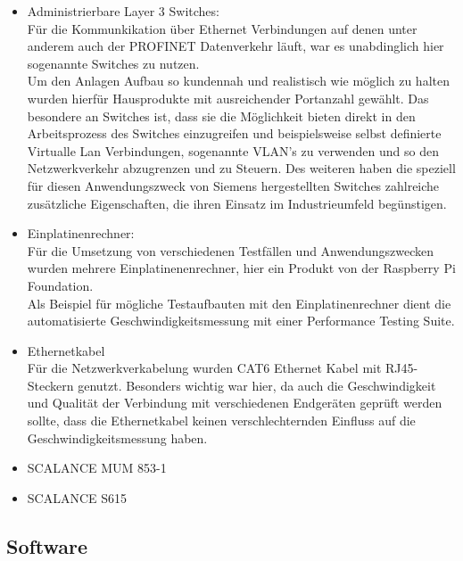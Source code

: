 \begin{itemize}
        \item Administrierbare Layer 3 Switches: \\
                Für die Kommunkikation über Ethernet Verbindungen auf denen unter anderem auch der PROFINET Datenverkehr läuft, war es unabdinglich hier sogenannte  Switches zu nutzen. \\
                Um den Anlagen Aufbau so kundennah und realistisch wie möglich zu halten wurden hierfür Hausprodukte mit ausreichender Portanzahl gewählt. Das besondere an  Switches ist, dass sie die Möglichkeit bieten direkt in den Arbeitsprozess des Switches einzugreifen und beispielsweise selbst definierte Virtualle Lan Verbindungen, sogenannte VLAN's zu verwenden und so den Netzwerkverkehr abzugrenzen und zu Steuern. Des weiteren haben die speziell für diesen Anwendungszweck von Siemens hergestellten Switches zahlreiche zusätzliche Eigenschaften, die ihren Einsatz im Industrieumfeld begünstigen. 
        \item Einplatinenrechner: \\
                Für die Umsetzung von verschiedenen Testfällen und Anwendungszwecken wurden mehrere Einplatinenenrechner, hier ein Produkt von der Raspberry Pi Foundation. \\
                Als Beispiel für mögliche Testaufbauten mit den Einplatinenrechner dient die automatisierte Geschwindigkeitsmessung mit einer Performance Testing Suite. 
        \item Ethernetkabel \\
                Für die Netzwerkverkabelung wurden CAT6 Ethernet Kabel mit RJ45-Steckern genutzt. Besonders wichtig war hier, da auch die Geschwindigkeit und Qualität der Verbindung mit verschiedenen Endgeräten geprüft werden sollte, dass die Ethernetkabel keinen verschlechternden Einfluss auf die Geschwindigkeitsmessung haben. \\
        \item SCALANCE MUM 853-1
                
        
        \item SCALANCE S615
\end{itemize}
\subsection{Software}

